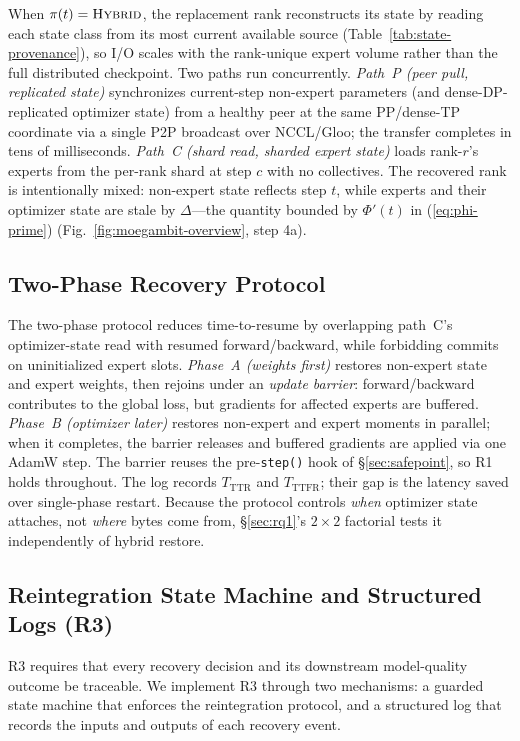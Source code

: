 \documentclass[10pt,conference]{IEEEtran}
\begin{document}
When $\pi(t)=\textsc{Hybrid}$, the replacement rank reconstructs its state by reading each state class from its most current available source (Table~\ref{tab:state-provenance}), so I/O scales with the rank-unique expert volume rather than the full distributed checkpoint. Two paths run concurrently. \emph{Path~P (peer pull, replicated state)} synchronizes current-step non-expert parameters (and dense-DP-replicated optimizer state) from a healthy peer at the same PP/dense-TP coordinate via a single P2P broadcast over NCCL/Gloo; the transfer completes in tens of milliseconds. \emph{Path~C (shard read, sharded expert state)} loads rank-$r$'s experts from the per-rank shard at step $c$ with no collectives. The recovered rank is intentionally mixed: non-expert state reflects step $t$, while experts and their optimizer state are stale by $\Delta$---the quantity bounded by $\Phi'(t)$ in (\ref{eq:phi-prime}) (Fig.~\ref{fig:moegambit-overview}, step 4a).

\subsection{Two-Phase Recovery Protocol}
\label{sec:twophase}

The two-phase protocol reduces time-to-resume by overlapping path~C's optimizer-state read with resumed forward/backward, while forbidding commits on uninitialized expert slots. \emph{Phase~A (weights first)} restores non-expert state and expert weights, then rejoins under an \emph{update barrier}: forward/backward contributes to the global loss, but gradients for affected experts are buffered. \emph{Phase~B (optimizer later)} restores non-expert and expert moments in parallel; when it completes, the barrier releases and buffered gradients are applied via one AdamW step. The barrier reuses the pre-\texttt{step()} hook of \S\ref{sec:safepoint}, so R1 holds throughout. The log records $T_{\text{TTR}}$ and $T_{\text{TTFR}}$; their gap is the latency saved over single-phase restart. Because the protocol controls \emph{when} optimizer state attaches, not \emph{where} bytes come from, \S\ref{sec:rq1}'s $2{\times}2$ factorial tests it independently of hybrid restore.

\subsection{Reintegration State Machine and Structured Logs (R3)}
\label{sec:obs}

R3 requires that every recovery decision and its downstream model-quality outcome be traceable. We implement R3 through two mechanisms: a guarded state machine that enforces the reintegration protocol, and a structured log that records the inputs and outputs of each recovery event.
\end{document}
